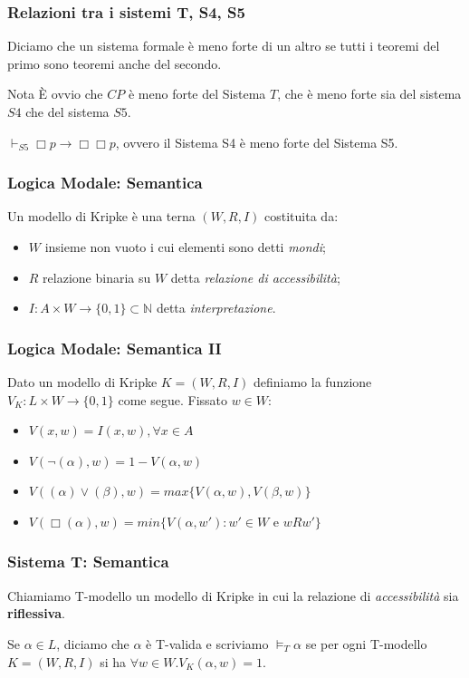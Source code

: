 \documentclass[notheorem,aspectratio=169]{beamer}
\begin{document}
\begin{frame}
\frametitle{Relazioni tra i sistemi T, S4, S5}
\begin{definition}
Diciamo che un sistema formale è meno forte di un altro se tutti i teoremi del primo
sono teoremi anche del secondo.
\end{definition}

\begin{block}{Nota}
È ovvio che $CP$ è meno forte del Sistema $T$, che è meno forte sia del sistema $S4$
che del sistema $S5$.
\end{block}
\begin{theorem}
$\vdash_{S5} \Box p \rightarrow \Box \Box p$, ovvero il Sistema S4 è meno forte del Sistema S5.
\end{theorem}
\end{frame}

\begin{frame}
\frametitle{Logica Modale: Semantica}

Un modello di Kripke è una terna $(W, R, I)$ costituita da:
\begin{itemize}
\item $W$ insieme non vuoto i cui elementi sono detti \emph{mondi};
\item $R$ relazione binaria su $W$ detta \emph{relazione di accessibilità};
\item $I : A \times W \to \{0, 1\} \subset \mathbb{N}$ detta \emph{interpretazione}.
\end{itemize}
\end{frame}


\begin{frame}
\frametitle{Logica Modale: Semantica II}

Dato un modello di Kripke $K = (W, R, I)$ definiamo la funzione $V_K : L \times W \to \{0, 1\}$
come segue.
Fissato $w \in W$:
\begin{itemize}
\item $V(x, w) = I(x, w), \forall x \in A$
\item $V(\neg (\alpha), w) = 1 - V(\alpha, w)$
\item $V((\alpha) \lor (\beta), w) = max\{V(\alpha, w), V(\beta, w)\}$
\item {\color{red} $V(\Box (\alpha), w) = min\{ V(\alpha, w') : w' \in W$ e $w R w' \}$}
\end{itemize}
\end{frame}

\begin{frame}
\frametitle{Sistema T: Semantica}
Chiamiamo T-modello un modello di Kripke in cui la relazione di \emph{accessibilità}
sia \textbf{riflessiva}.

Se $\alpha \in L$, diciamo che $\alpha$ è T-valida e
scriviamo $\vDash_T \alpha$ se per ogni T-modello $K = (W, R, I)$
si ha $\forall w \in W. V_K(\alpha, w) = 1$.
\end{frame}
\end{document}
